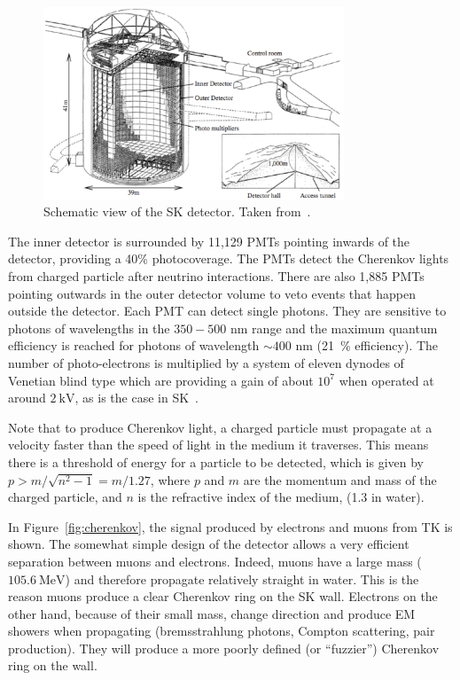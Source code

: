 \begin{figure}[ht]
  \center
  \includegraphics[width=0.8\textwidth]{images/T2K/SK_JHFDiagram.eps}
  \caption[SK detector]{Schematic view of the \Gls{SK} detector. Taken
    from~\cite{SK2003}.}
  \label{fig:sk}
\end{figure}

The inner detector is surrounded by 11,129 \Glspl{PMT} pointing
inwards of the detector, providing a 40\% photocoverage. The
\Glspl{PMT} detect the Cherenkov lights from charged particle after
neutrino interactions. There are also 1,885 \Glspl{PMT} pointing
outwards in the outer detector volume to veto events that happen
outside the detector. Each \Gls{PMT} can detect single photons. They
are sensitive to photons of wavelengths in the $350 - 500\text{~nm}$
range and the maximum quantum efficiency is reached for photons of
wavelength $\sim 400\text{~nm}$ (21~\% efficiency). The number of
photo-electrons is multiplied by a system of eleven dynodes of
Venetian blind type which are providing a gain of about $10^7$ when
operated at around $2~\text{kV}$, as is the case in
\Gls{SK}~\cite{SKPMT}.

Note that to produce Cherenkov light, a charged particle must
propagate at a velocity faster than the speed of light in the medium
it traverses. This means there is a threshold of energy for a particle
to be detected, which is given by $p>m/\sqrt{n^2-1}=m/1.27$, where $p$
and $m$ are the momentum and mass of the charged particle, and $n$ is
the refractive index of the medium, (1.3 in water).

In Figure~\ref{fig:cherenkov}, the signal produced by electrons and
muons from \Gls{TK} is shown. The somewhat simple design of the
detector allows a very efficient separation between muons and
electrons. Indeed, muons have a large mass ($105.6~\text{MeV}$) and
therefore propagate relatively straight in water. This is the reason
muons produce a clear Cherenkov ring on the \Gls{SK} wall. Electrons
on the other hand, because of their small mass, change direction and
produce \Gls{EM} showers when propagating (bremsstrahlung photons,
Compton scattering, pair production). They will produce a more poorly
defined (or ``fuzzier'') Cherenkov ring on the wall.

